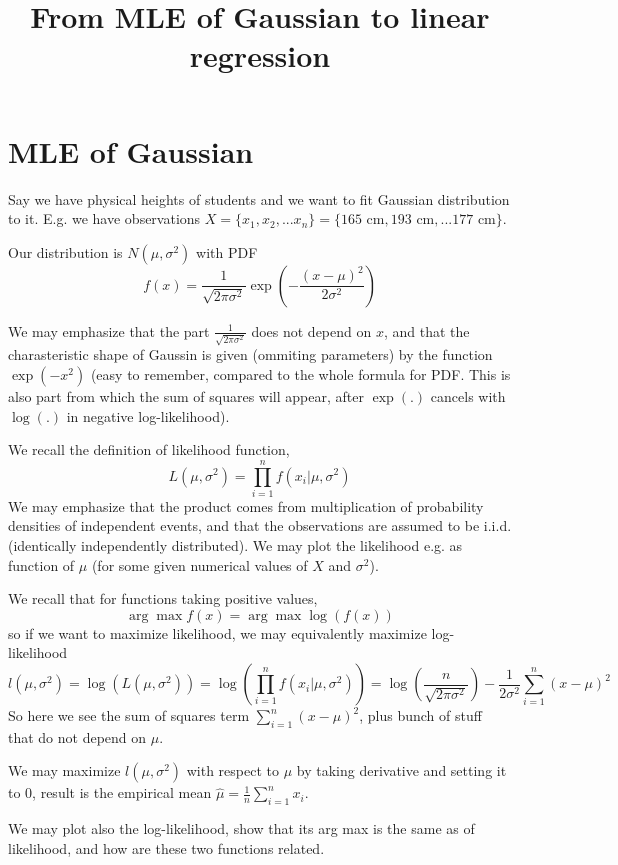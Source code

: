 \documentclass{article}
\title{From MLE of Gaussian to linear regression}
\date{}
\theoremstyle{remark}
\theoremstyle{definition}
\begin{document}
	
	\maketitle
	
	\section{MLE of Gaussian}
	Say we have physical heights of students and we want to fit Gaussian distribution to it. E.g. we have observations $X = \{x_1, x_2,...x_n\} =  \{ 165 \text{ cm}, 193 \text{ cm},...177 \text{ cm}\}$.
	
	Our distribution is $N(\mu, \sigma^2)$ with PDF 
	$$
	f(x) = \frac{1}{\sqrt{2 \pi \sigma^2}} \exp \left( - \frac{\left( x-\mu \right)^2 }{2\sigma^2} \right)
	$$
	
	We may emphasize that the part $\frac{1}{\sqrt{2 \pi \sigma^2}}$ does not depend on $x$, and that the charasteristic shape of Gaussin is given (ommiting parameters) by the function $\exp(-x^2)$ (easy to remember, compared to the whole formula for PDF. This is also part from which the sum of squares will appear, after $\exp(.)$ cancels with $\log(.)$ in negative log-likelihood).
	
	We recall the definition of likelihood function, 
	$$L(\mu, \sigma^2) = \prod_{i=1}^{n} f(x_i | \mu, \sigma^2)$$ 
	We may emphasize that the product comes from multiplication of probability densities of independent events, and that the observations are assumed to be i.i.d. (identically independently distributed). We may plot the likelihood e.g. as function of $\mu$ (for some given numerical values of $X$ and $\sigma^2$).
	
	We recall that for functions taking positive values,
	 $$\arg \max f(x) = \arg \max \log(f(x))$$
	 so if we want to maximize likelihood, we may equivalently maximize log-likelihood
	 $$
	 l(\mu, \sigma^2) = \log \left( L(\mu, \sigma^2) \right) = \log \left( \prod_{i=1}^{n} f(x_i | \mu, \sigma^2) \right) = \log \left( \frac{n}{\sqrt{2 \pi \sigma^2}} \right) - \frac{1}{2\sigma^2} \sum_{i=1}^{n} (x-\mu)^2
	 $$
	 So here we see the sum of squares term $\sum_{i=1}^{n} (x-\mu)^2$, plus bunch of stuff that do not depend on $\mu$.
	 
	 We may maximize $l(\mu, \sigma^2)$ with respect to $\mu$ by taking derivative and setting it to $0$, result is the empirical mean $\hat{\mu} = \frac{1}{n}\sum_{i=1}^{n} x_i$.
	 
	 We may plot also the log-likelihood, show that its arg max is the same as of likelihood, and how are these two functions related.
	 
\end{document}
